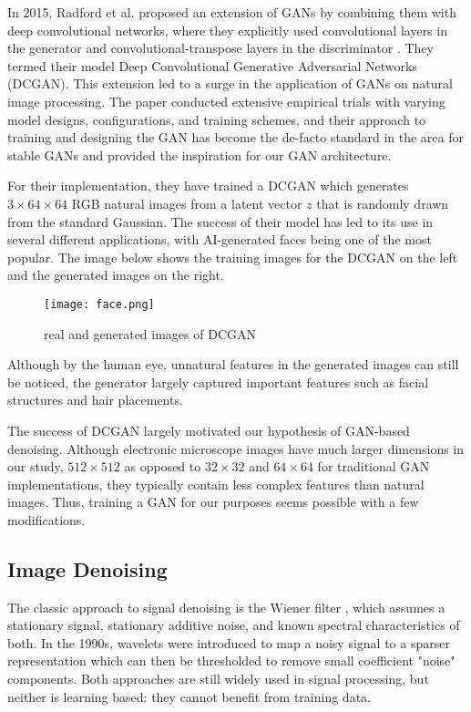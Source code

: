 \documentclass{article}
\begin{document}
In 2015, Radford et al. proposed an extension of GANs by combining them with deep convolutional networks, where they explicitly used convolutional layers in the generator and convolutional-transpose layers in the discriminator \cite{DCGAN}. They termed their model Deep Convolutional Generative Adversarial Networks (DCGAN).  This extension led to a surge in the application of GANs on natural image processing. The paper conducted extensive empirical trials with varying model designs, configurations, and training schemes, and their approach to training and designing the GAN has become the de-facto standard in the area for stable GANs and provided the inspiration for our GAN architecture. 

For their implementation, they have trained a DCGAN which generates $3\times 64\times 64$ RGB natural images from a latent vector $z$ that is randomly drawn from the standard Gaussian. The success of their model has led to its use in several different applications, with AI-generated faces being one of the most popular. The image below shows the training images for the DCGAN on the left and the generated images on the right.
\begin{figure}[!h]
    \centering
    \texttt{[image: face.png]}
    \caption{real and generated images of DCGAN}
    \label{fig:face}
\end{figure}
\FloatBarrier
Although by the human eye, unnatural features in the generated images can still be noticed, the generator largely captured important features such as facial structures and hair placements. 

The success of DCGAN largely motivated our hypothesis of GAN-based denoising. Although electronic microscope images have much larger dimensions in our study, $512\times 512$ as opposed to $32\times 32$ and $64\times 64$ for traditional GAN implementations, they typically contain less complex features than natural images. Thus, training a GAN for our purposes seems possible with a few modifications.

\subsection{Image Denoising}
The classic approach to signal denoising is the Wiener filter \cite{wiener}, which assumes a stationary signal, stationary additive noise, and known spectral characteristics of both. In the 1990s, wavelets were introduced to map a noisy signal to a sparser representation which can then be thresholded to remove small coefficient "noise" components. Both approaches are still widely used in signal processing, but neither is learning based: they cannot benefit from training data.  
\end{document}
